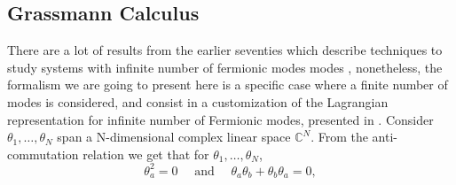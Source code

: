 

\subsection{Grassmann Calculus}
There are a lot of results from the earlier seventies which describe techniques to study systems with infinite number of fermionic modes modes \cite{soper_construction_1978}, nonetheless, the formalism we are going to present here is a specific case where  a finite number of modes is considered, and consist in a customization of the Lagrangian representation for infinite number of Fermionic modes, presented in \cite{bravyi_classical_2005}. 
Consider $\theta_{1},\ldots,\theta_N$ span a N-dimensional complex linear space $\mathbb{C}^{N}$. From the anti-commutation relation we get that for $\theta_{1},\ldots,\theta_N$,
\begin{equation}
\theta_{a}^{2}=0 \quad \text { and } \quad \theta_{a} \theta_{b}+\theta_{b} \theta_{a}=0,
\label{CH2:Grassmann_anticommutation}
\end{equation}

